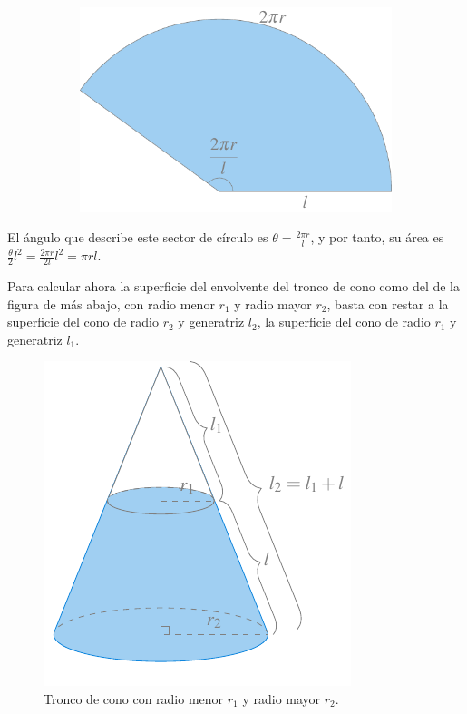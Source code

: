 \documentclass[
  a4paper,
]{scrreport}
\theoremstyle{definition}
\theoremstyle{plain}
\theoremstyle{definition}
\theoremstyle{definition}
\theoremstyle{plain}
\theoremstyle{plain}
\theoremstyle{remark}
\begin{document}
\begin{figure}
\begin{minipage}{0.50\linewidth}
\begin{figure}[H]
{\centering \includegraphics{./img/integrales/superficie-cono.pdf}

}


\end{figure}%

\end{minipage}%

\end{figure}%

El ángulo que describe este sector de círculo es
\(\theta = \frac{2\pi r}{l}\), y por tanto, su área es
\(\frac{\theta}{2}l^2= \frac{2\pi r}{2l}l^2 = \pi rl\).

Para calcular ahora la superficie del envolvente del tronco de cono como
del de la figura de más abajo, con radio menor \(r_1\) y radio mayor
\(r_2\), basta con restar a la superficie del cono de radio \(r_2\) y
generatriz \(l_2\), la superficie del cono de radio \(r_1\) y generatriz
\(l_1\).

\begin{figure}[H]

{\centering \includegraphics{img/integrales/cono-truncado.pdf}

}

\caption{Tronco de cono con radio menor \(r_1\) y radio mayor \(r_2\).}

\end{figure}%
\end{document}
